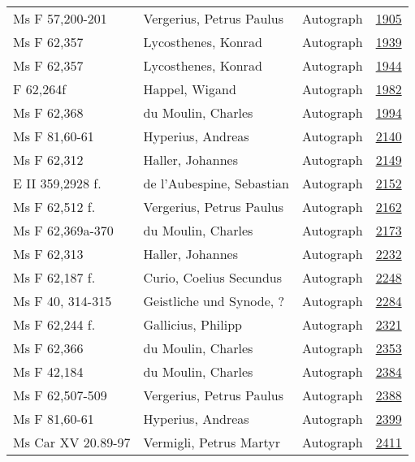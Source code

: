 \documentclass[10pt,a4paper,landscape]{report}
\begin{document}
\begin{longtable}{p{16cm}p{4cm}lr}
Ms F 57,200-201	&	Vergerius, Petrus Paulus	&	Autograph	&	\href{http://130.60.24.72/assignment/1905}{1905}\\
Ms F 62,357	&	Lycosthenes, Konrad	&	Autograph	&	\href{http://130.60.24.72/assignment/1939}{1939}\\
Ms F 62,357	&	Lycosthenes, Konrad	&	Autograph	&	\href{http://130.60.24.72/assignment/1944}{1944}\\
F 62,264f	&	Happel, Wigand	&	Autograph	&	\href{http://130.60.24.72/assignment/1982}{1982}\\
Ms F 62,368	&	du Moulin, Charles	&	Autograph	&	\href{http://130.60.24.72/assignment/1994}{1994}\\
Ms F 81,60-61	&	Hyperius, Andreas	&	Autograph	&	\href{http://130.60.24.72/assignment/2140}{2140}\\
Ms F 62,312	&	Haller, Johannes	&	Autograph	&	\href{http://130.60.24.72/assignment/2149}{2149}\\
E II 359,2928 f.	&	de l'Aubespine, Sebastian	&	Autograph	&	\href{http://130.60.24.72/assignment/2152}{2152}\\
Ms F 62,512 f.	&	Vergerius, Petrus Paulus	&	Autograph	&	\href{http://130.60.24.72/assignment/2162}{2162}\\
Ms F 62,369a-370	&	du Moulin, Charles	&	Autograph	&	\href{http://130.60.24.72/assignment/2173}{2173}\\
Ms F 62,313	&	Haller, Johannes	&	Autograph	&	\href{http://130.60.24.72/assignment/2232}{2232}\\
Ms F 62,187 f.	&	Curio, Coelius Secundus	&	Autograph	&	\href{http://130.60.24.72/assignment/2248}{2248}\\
Ms F 40, 314-315	&	Geistliche und Synode, ?	&	Autograph	&	\href{http://130.60.24.72/assignment/2284}{2284}\\
Ms F 62,244 f.	&	Gallicius, Philipp	&	Autograph	&	\href{http://130.60.24.72/assignment/2321}{2321}\\
Ms F 62,366	&	du Moulin, Charles	&	Autograph	&	\href{http://130.60.24.72/assignment/2353}{2353}\\
Ms F 42,184	&	du Moulin, Charles	&	Autograph	&	\href{http://130.60.24.72/assignment/2384}{2384}\\
Ms F 62,507-509	&	Vergerius, Petrus Paulus	&	Autograph	&	\href{http://130.60.24.72/assignment/2388}{2388}\\
Ms F 81,60-61	&	Hyperius, Andreas	&	Autograph	&	\href{http://130.60.24.72/assignment/2399}{2399}\\
Ms Car XV 20.89-97	&	Vermigli, Petrus Martyr	&	Autograph	&	\href{http://130.60.24.72/assignment/2411}{2411}\\

\end{longtable}
\end{document}
